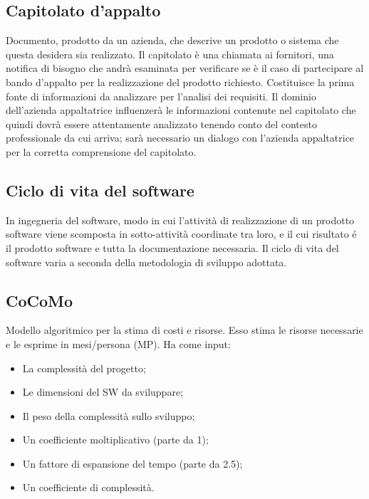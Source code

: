 	

	\subsection{Capitolato d'appalto}
	\label{sec:capitolato}
	Documento, prodotto da un azienda, che descrive un prodotto o sistema che questa desidera sia realizzato. Il capitolato è una chiamata ai fornitori, una notifica di bisogno che andrà esaminata per verificare se è il caso di partecipare al bando d'appalto per la realizzazione del prodotto richiesto. Costituisce la prima fonte di informazioni da analizzare per l'analisi dei requisiti. Il dominio dell'azienda appaltatrice influenzerà le informazioni contenute nel capitolato che quindi dovrà essere attentamente analizzato tenendo conto del contesto professionale da cui arriva; sarà necessario un dialogo con l'azienda appaltatrice per la corretta comprensione del capitolato. 
	
	\subsection{Ciclo di vita del software}
	\label{sec:ciclodivita}
	In ingegneria del software, modo in cui l'attività di realizzazione di un prodotto software viene scomposta in sotto-attività coordinate tra loro, e il cui risultato é il prodotto software e tutta la documentazione necessaria. Il ciclo di vita del software varia a seconda della metodologia di sviluppo adottata.

	\subsection{CoCoMo}
	\label{sec:cocomo}
	Modello algoritmico per la stima di costi e risorse. Esso stima le risorse necessarie e le esprime in mesi/persona (MP). Ha come input:
	\begin{itemize}  
	\item La complessità del progetto;
	\item Le dimensioni del SW da sviluppare;
	\item Il peso della complessità sullo sviluppo;
	\item Un coefficiente moltiplicativo (parte da 1);
	\item Un fattore di espansione del tempo (parte da 2.5);
	\item Un coefficiente di complessità.
	\end{itemize}		

